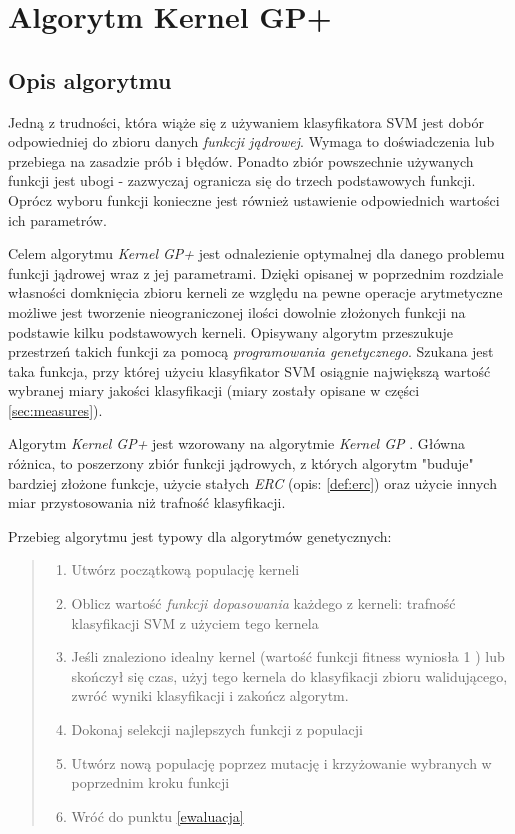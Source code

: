 \chapter{Algorytm Kernel GP+}
\label{ch:alg}
\section{Opis algorytmu}
Jedną z trudności, która wiąże się z używaniem klasyfikatora SVM jest dobór odpowiedniej do zbioru danych \textit{funkcji jądrowej}. Wymaga to doświadczenia lub przebiega na zasadzie prób i błędów. Ponadto zbiór powszechnie używanych funkcji jest ubogi - zazwyczaj ogranicza się do trzech podstawowych funkcji. Oprócz wyboru funkcji konieczne jest również ustawienie odpowiednich wartości ich parametrów.

Celem algorytmu \emph{Kernel GP+} jest odnalezienie optymalnej dla danego problemu funkcji jądrowej wraz z jej parametrami. Dzięki opisanej w poprzednim rozdziale własności domknięcia zbioru kerneli ze względu na pewne operacje arytmetyczne możliwe jest tworzenie nieograniczonej ilości dowolnie złożonych funkcji na podstawie kilku podstawowych kerneli. Opisywany algorytm przeszukuje przestrzeń takich funkcji za pomocą \textit{programowania genetycznego}. Szukana jest taka funkcja, przy której użyciu klasyfikator SVM osiągnie największą wartość wybranej miary jakości klasyfikacji (miary zostały opisane w części \ref{sec:measures}).

Algorytm \emph{Kernel GP+} jest wzorowany na algorytmie \emph{Kernel GP} \cite{sullivan_evolving_2007}. Główna różnica, to poszerzony zbiór funkcji jądrowych, z których algorytm "buduje" bardziej złożone funkcje, użycie stałych \emph{ERC} (opis: \ref{def:erc}) oraz użycie innych miar przystosowania niż trafność klasyfikacji.

Przebieg algorytmu jest typowy dla algorytmów genetycznych:
\begin{quote}
\begin{enumerate}
\item Utwórz początkową populację kerneli
\item \label{ewaluacja} Oblicz wartość \textit{funkcji dopasowania} każdego z kerneli: trafność klasyfikacji SVM z użyciem tego kernela
\item Jeśli znaleziono idealny kernel (wartość funkcji fitness wyniosła 1 ) lub skończył się czas, użyj tego kernela do klasyfikacji zbioru walidującego, zwróć wyniki klasyfikacji i zakończ algorytm.
\item Dokonaj selekcji najlepszych funkcji z populacji
\item Utwórz nową populację poprzez mutację i krzyżowanie wybranych w poprzednim kroku funkcji
\item Wróć do punktu \ref{ewaluacja}
\end{enumerate}
\end{quote}

